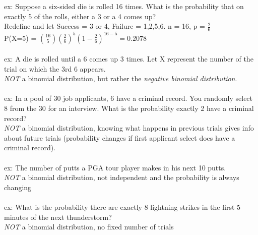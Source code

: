 \documentclass[12pt, a4paper]{article}
\begin{document}
	ex: Suppose a six-sided die is rolled 16 times. What is the probability that on exactly 5 of the rolls, either a 3 or a 4 comes up? \\
	Redefine and let Success = 3 or 4, Failure = 1,2,5,6. n = 16, p = $\frac{2}{6}$ \\
	P(X=5) = $\binom{16}{5}(\frac{2}{6})^5(1-\frac{2}{6})^{16-5} = 0.2078$ \\~\\
	ex: A die is rolled until a 6 comes up 3 times. Let X represent the number of the trial on which the 3rd 6 appears. \\
	\textit{NOT} a binomial distribution, but rather the \textit{negative binomial distribution}. \\~\\
	ex: In a pool of 30 job applicants, 6 have a criminal record. You randomly select 8 from the 30 for an interview. What is the probability exactly 2 have a criminal record? \\
	\textit{NOT} a binomial distribution, knowing what happens in previous trials gives info about future trials (probability changes if first applicant select does have a criminal record). \\~\\
	ex: The number of putts a PGA tour player makes in his next 10 putts. \\
	\textit{NOT} a binomial distribution, not independent and the probability is always changing \\~\\
	ex: What is the probability there are exactly 8 lightning strikes in the first 5 minutes of the next thunderstorm? \\
	\textit{NOT} a binomial distribution, no fixed number of trials \newpage
	
\end{document}
